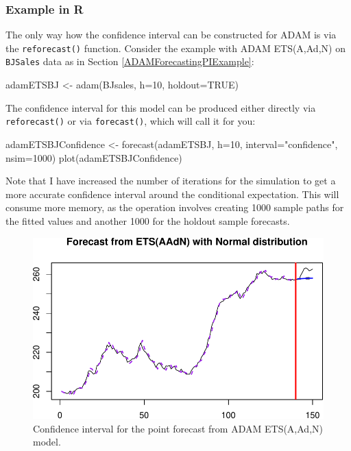 \documentclass[
]{book}
\newenvironment{Shaded}{\begin{snugshade}}{\end{snugshade}}
\newcommand{\AttributeTok}[1]{\textcolor[rgb]{0.77,0.63,0.00}{#1}}
\newcommand{\ConstantTok}[1]{\textcolor[rgb]{0.00,0.00,0.00}{#1}}
\newcommand{\DecValTok}[1]{\textcolor[rgb]{0.00,0.00,0.81}{#1}}
\newcommand{\FunctionTok}[1]{\textcolor[rgb]{0.00,0.00,0.00}{#1}}
\newcommand{\NormalTok}[1]{#1}
\newcommand{\OtherTok}[1]{\textcolor[rgb]{0.56,0.35,0.01}{#1}}
\newcommand{\StringTok}[1]{\textcolor[rgb]{0.31,0.60,0.02}{#1}}
\theoremstyle{definition}
\theoremstyle{definition}
\theoremstyle{definition}
\theoremstyle{definition}
\theoremstyle{remark}
\begin{document}
\hypertarget{example-in-r-2}{%
\subsubsection{Example in R}\label{example-in-r-2}}

The only way how the confidence interval can be constructed for ADAM is via the \texttt{reforecast()} function. Consider the example with ADAM ETS(A,Ad,N) on \texttt{BJSales} data as in Section \ref{ADAMForecastingPIExample}:

\begin{Shaded}
\begin{Highlighting}[]
\NormalTok{adamETSBJ }\OtherTok{\textless{}{-}} \FunctionTok{adam}\NormalTok{(BJsales, }\AttributeTok{h=}\DecValTok{10}\NormalTok{, }\AttributeTok{holdout=}\ConstantTok{TRUE}\NormalTok{)}
\end{Highlighting}
\end{Shaded}

The confidence interval for this model can be produced either directly via \texttt{reforecast()} or via \texttt{forecast()}, which will call it for you:

\begin{Shaded}
\begin{Highlighting}[]
\NormalTok{adamETSBJConfidence }\OtherTok{\textless{}{-}} \FunctionTok{forecast}\NormalTok{(adamETSBJ, }\AttributeTok{h=}\DecValTok{10}\NormalTok{,}
                                \AttributeTok{interval=}\StringTok{"confidence"}\NormalTok{, }\AttributeTok{nsim=}\DecValTok{1000}\NormalTok{)}
\FunctionTok{plot}\NormalTok{(adamETSBJConfidence)}
\end{Highlighting}
\end{Shaded}

Note that I have increased the number of iterations for the simulation to get a more accurate confidence interval around the conditional expectation. This will consume more memory, as the operation involves creating 1000 sample paths for the fitted values and another 1000 for the holdout sample forecasts.

\begin{figure}
\centering
\includegraphics{Svetunkov--2022----ADAM_files/figure-latex/adamModelConfidence-1.pdf}
\caption{\label{fig:adamModelConfidence}Confidence interval for the point forecast from ADAM ETS(A,Ad,N) model.}
\end{figure}
\end{document}
